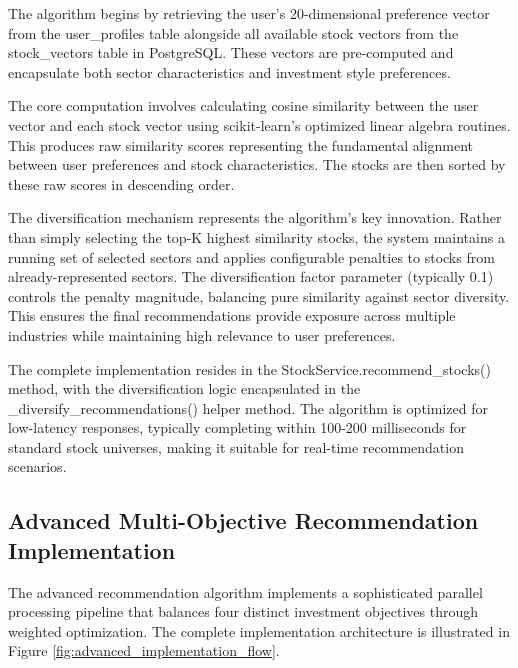 The algorithm begins by retrieving the user's 20-dimensional preference vector from the user\_profiles table alongside all available stock vectors from the stock\_vectors table in PostgreSQL. These vectors are pre-computed and encapsulate both sector characteristics and investment style preferences.

The core computation involves calculating cosine similarity between the user vector and each stock vector using scikit-learn's optimized linear algebra routines. This produces raw similarity scores representing the fundamental alignment between user preferences and stock characteristics. The stocks are then sorted by these raw scores in descending order.

The diversification mechanism represents the algorithm's key innovation. Rather than simply selecting the top-K highest similarity stocks, the system maintains a running set of selected sectors and applies configurable penalties to stocks from already-represented sectors. The diversification factor parameter (typically 0.1) controls the penalty magnitude, balancing pure similarity against sector diversity. This ensures the final recommendations provide exposure across multiple industries while maintaining high relevance to user preferences.

The complete implementation resides in the StockService.recommend\_stocks() method, with the diversification logic encapsulated in the \_diversify\_recommendations() helper method. The algorithm is optimized for low-latency responses, typically completing within 100-200 milliseconds for standard stock universes, making it suitable for real-time recommendation scenarios.

\subsection{Advanced Multi-Objective Recommendation Implementation}

The advanced recommendation algorithm implements a sophisticated parallel processing pipeline that balances four distinct investment objectives through weighted optimization. The complete implementation architecture is illustrated in Figure \ref{fig:advanced_implementation_flow}.

